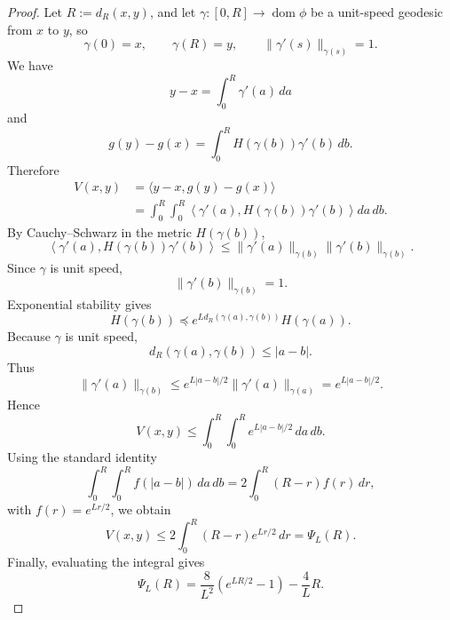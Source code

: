 \documentclass[11pt]{article}
\begin{document}
\begin{proof}
Let \(R:=d_R(x,y)\), and let \(\gamma:[0,R]\to\operatorname{dom}\phi\) be a unit-speed geodesic from \(x\) to \(y\), so
\[
    \gamma(0)=x,
    \qquad
    \gamma(R)=y,
    \qquad
    \|\gamma'(s)\|_{\gamma(s)}=1.
\]
We have
\[
    y-x=\int_0^R \gamma'(a)\,da
\]
and
\[
    g(y)-g(x)
    =
    \int_0^R H(\gamma(b))\gamma'(b)\,db.
\]
Therefore
\[
\begin{aligned}
    V(x,y)
    &=
    \langle y-x,g(y)-g(x)\rangle \\
    &=
    \int_0^R\int_0^R
    \left\langle
        \gamma'(a),
        H(\gamma(b))\gamma'(b)
    \right\rangle
    da\,db .
\end{aligned}
\]
By Cauchy--Schwarz in the metric \(H(\gamma(b))\),
\[
    \left\langle
        \gamma'(a),
        H(\gamma(b))\gamma'(b)
    \right\rangle
    \le
    \|\gamma'(a)\|_{\gamma(b)}
    \|\gamma'(b)\|_{\gamma(b)}.
\]
Since \(\gamma\) is unit speed,
\[
    \|\gamma'(b)\|_{\gamma(b)}=1.
\]
Exponential stability gives
\[
    H(\gamma(b))
    \preceq
    e^{L d_R(\gamma(a),\gamma(b))}H(\gamma(a)).
\]
Because \(\gamma\) is unit speed,
\[
    d_R(\gamma(a),\gamma(b))\le |a-b|.
\]
Thus
\[
    \|\gamma'(a)\|_{\gamma(b)}
    \le
    e^{L|a-b|/2}
    \|\gamma'(a)\|_{\gamma(a)}
    =
    e^{L|a-b|/2}.
\]
Hence
\[
    V(x,y)
    \le
    \int_0^R\int_0^R e^{L|a-b|/2}\,da\,db.
\]
Using the standard identity
\[
    \int_0^R\int_0^R f(|a-b|)\,da\,db
    =
    2\int_0^R (R-r)f(r)\,dr,
\]
with \(f(r)=e^{Lr/2}\), we obtain
\[
    V(x,y)
    \le
    2\int_0^R (R-r)e^{Lr/2}\,dr
    =
    \Psi_L(R).
\]
Finally, evaluating the integral gives
\[
    \Psi_L(R)
    =
    \frac{8}{L^2}\left(e^{LR/2}-1\right)
    -
    \frac{4}{L}R.
\]
\end{proof}
\end{document}
